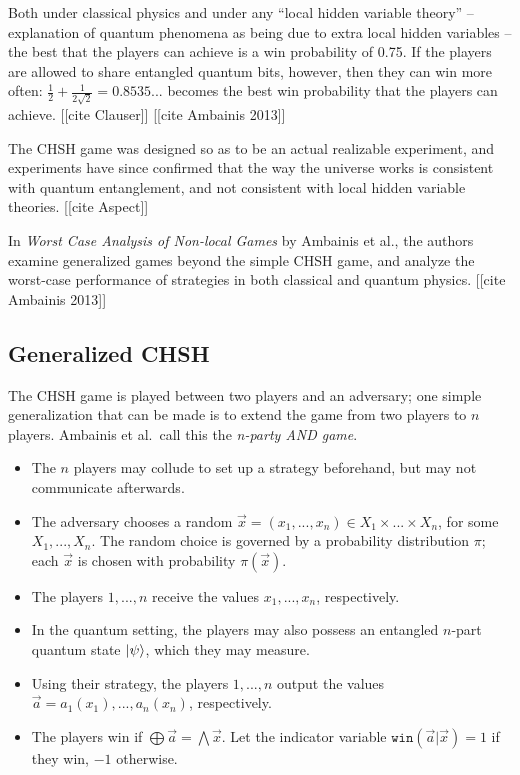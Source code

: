 Both under classical physics and under any ``local hidden variable theory'' -- explanation of quantum phenomena as being due to extra local hidden variables -- the best that the players can achieve is a win probability of 0.75. If the players are allowed to share entangled quantum bits, however, then they can win more often: $\frac12 + \frac1{2\sqrt2} = 0.8535$... becomes the best win probability that the players can achieve. [[cite Clauser]] [[cite Ambainis 2013]]

The CHSH game was designed so as to be an actual realizable experiment, and experiments have since confirmed that the way the universe works is consistent with quantum entanglement, and not consistent with local hidden variable theories. [[cite Aspect]]

In \emph{Worst Case Analysis of Non-local Games} by Ambainis et al., the authors examine generalized games beyond the simple CHSH game, and analyze the worst-case performance of strategies in both classical and quantum physics. [[cite Ambainis 2013]]

\subsection{Generalized CHSH}

The CHSH game is played between two players and an adversary; one simple generalization that can be made is to extend the game from two players to $n$ players. Ambainis et al.~call this the \emph{n-party AND game}.

\begin{itemize}
\item{The $n$ players may collude to set up a strategy beforehand, but may not communicate afterwards.}
\item{The adversary chooses a random $\vec{x}=(x_1, ..., x_n) \in X_1 \times ... \times X_n$, for some $X_1, ..., X_n$. The random choice is governed by a probability distribution $\pi$; each $\vec{x}$ is chosen with probability $\pi(\vec{x})$.}
\item{The players $1, ..., n$ receive the values $x_1, ..., x_n$, respectively.}
\item{In the quantum setting, the players may also possess an entangled $n$-part quantum state $\ket{\psi}$, which they may measure.}
\item{Using their strategy, the players $1, ..., n$ output the values $\vec{a} = a_1(x_1), ..., a_n(x_n)$, respectively.}
\item{The players win if $\bigoplus \vec{a} = \bigwedge \vec{x}$. Let the indicator variable $\texttt{win}(\vec{a}|\vec{x}) = 1$ if they win, $-1$ otherwise.}
\end{itemize}

